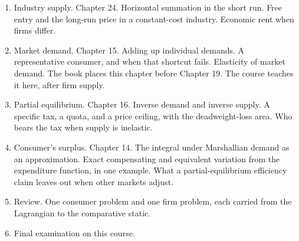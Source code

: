 \documentclass[11pt]{article}
\begin{document}
\begin{enumerate}
\item Industry supply. Chapter 24. Horizontal summation in the short run. Free entry and the long-run price in a constant-cost industry. Economic rent when firms differ.
\item Market demand. Chapter 15. Adding up individual demands. A representative consumer, and when that shortcut fails. Elasticity of market demand. The book places this chapter before Chapter 19. The course teaches it here, after firm supply.
\item Partial equilibrium. Chapter 16. Inverse demand and inverse supply. A specific tax, a quota, and a price ceiling, with the deadweight-loss area. Who bears the tax when supply is inelastic.
\item Consumer's surplus. Chapter 14. The integral under Marshallian demand as an approximation. Exact compensating and equivalent variation from the expenditure function, in one example. What a partial-equilibrium efficiency claim leaves out when other markets adjust.
\item Review. One consumer problem and one firm problem, each carried from the Lagrangian to the comparative static.
\item Final examination on this course.
\end{enumerate}
\end{document}
